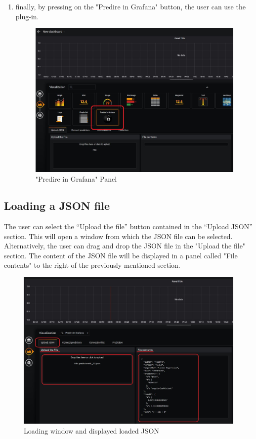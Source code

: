 \begin{enumerate}
	\item finally, by pressing on the "Predire in Grafana" button, the user can use the plug-in.
	
\begin{figure}[H]
\centering
\includegraphics[scale=0.55]{img/plug-in/plugin_1.JPG}
\caption{"Predire in Grafana" Panel}
\end{figure}

\end{enumerate}

	
\subsection{Loading a JSON file}
The user can select the “Upload the file” button contained in the “Upload JSON” section.
This will open a window from which the JSON file can be selected.
Alternatively, the user can drag and drop the JSON file in the "Upload the file" section.
The content of the JSON file will be displayed in a panel called "File contents" to the right of the previously mentioned section.

\begin{figure}[H]
\centering
\includegraphics[scale=0.60]{img/plug-in/plugin_2.JPG}
\caption{Loading window and displayed loaded JSON}
\end{figure}


